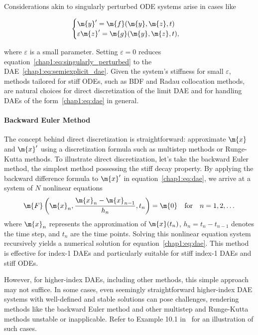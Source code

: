 Considerations akin to singularly perturbed \ac{ODE} systems arise in cases like

\begin{equation}
  \begin{cases}
  \m{y}^{\prime} = \m{f}(\m{y}, \m{z}, t) \\
  \varepsilon \m{z}^{\prime} = \m{g}(\m{y}, \m{z}, t),
  \end{cases}
  \label{chap1:eq:singularly_perturbed}
\end{equation}

where $\varepsilon$ is a small parameter. Setting $\varepsilon = 0$ reduces equation~\eqref{chap1:eq:singularly_perturbed} to the \ac{DAE}~\eqref{chap1:eq:semiexplicit_dae}. Given the system's stiffness for small $\varepsilon$, methods tailored for stiff \acp{ODE}, such as \ac{BDF} and Radau collocation methods, are natural choices for direct discretization of the limit \ac{DAE} and for handling \acp{DAE} of the form~\eqref{chap1:eq:dae} in general.

\paragraph{Backward Euler Method}

The concept behind direct discretization is straightforward: approximate $\m{x}$ and $\m{x}^{\prime}$ using a discretization formula such as multistep methods or Runge-Kutta methods. To illustrate direct discretization, let's take the backward Euler method, the simplest method possessing the stiff decay property. By applying the backward difference formula to $\m{x}^{\prime}$ in equation~\eqref{chap1:eq:dae}, we arrive at a system of $N$ nonlinear equations
%
\begin{equation*}
  \m{F}\left(\m{x}_n, \dfrac{\m{x}_n - \m{x}_{n-1}}{h_n}, t_n\right) = \m{0} \quad \text{for} \quad n = 1, 2, \dots
\end{equation*}
%
where $\m{x}_n$ represents the approximation of $\m{x}(t_n)$, $h_n = t_n - t_{n-1}$ denotes the time step, and $t_n$ are the time points. Solving this nonlinear equation system recursively yields a numerical solution for equation~\eqref{chap1:eq:dae}. This method is effective for index-1 \acp{DAE} and particularly suitable for stiff index-1 \acp{DAE} and stiff \acp{ODE}.

However, for higher-index \acp{DAE}, including other methods, this simple approach may not suffice. In some cases, even seemingly straightforward higher-index \ac{DAE} systems with well-defined and stable solutions can pose challenges, rendering methods like the backward Euler method and other multistep and Runge-Kutta methods unstable or inapplicable. Refer to Example 10.1 in~\cite{ascher1998computer} for an illustration of such cases.

